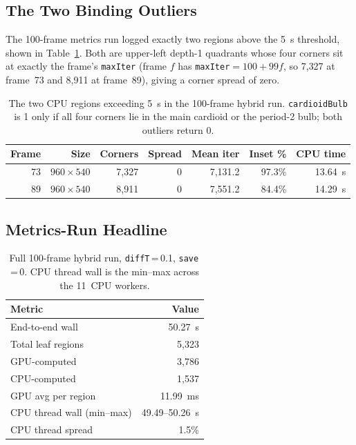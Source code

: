 \documentclass[
	english,
	letterpaper, oneside
]{article}
\begin{document}
\subsection{The Two Binding Outliers}

The 100-frame metrics run logged exactly two regions above the 5~s threshold,
shown in Table~\ref{tab:outliers}. Both are upper-left depth-1 quadrants whose
four corners sit at exactly the frame's \texttt{maxIter} (frame $f$ has
\texttt{maxIter}$=100+99f$, so 7{,}327 at frame~73 and 8{,}911 at frame~89),
giving a corner spread of zero.

\begin{table}[H]
    \centering
    \caption{The two CPU regions exceeding 5~s in the 100-frame hybrid run.
             \texttt{cardioidBulb} is 1 only if all four corners lie in the main
             cardioid or the period-2 bulb; both outliers return 0.}
    \label{tab:outliers}
    \begin{tabular}{rrrrrrr}
        \hline
        Frame & Size & Corners & Spread & Mean iter & Inset \% & CPU time \\
        \hline
        73 & $960\times540$ & 7{,}327 & 0 & 7{,}131.2 & 97.3\% & 13.64~s \\
        89 & $960\times540$ & 8{,}911 & 0 & 7{,}551.2 & 84.4\% & 14.29~s \\
        \hline
    \end{tabular}
\end{table}

\subsection{Metrics-Run Headline}

\begin{table}[H]
    \centering
    \caption{Full 100-frame hybrid run, \texttt{diffT}\,=\,0.1,
             \texttt{save}\,=\,0. CPU thread wall is the min--max across the
             11~CPU workers.}
    \label{tab:metrics}
    \begin{tabular}{lr}
        \hline
        Metric & Value \\
        \hline
        End-to-end wall                 & 50.27~s \\
        Total leaf regions              & 5{,}323 \\
        \quad GPU-computed              & 3{,}786 \\
        \quad CPU-computed              & 1{,}537 \\
        GPU avg per region              & 11.99~ms \\
        CPU thread wall (min--max)      & 49.49--50.26~s \\
        CPU thread spread               & 1.5\% \\
        \hline
    \end{tabular}
\end{table}
\end{document}

